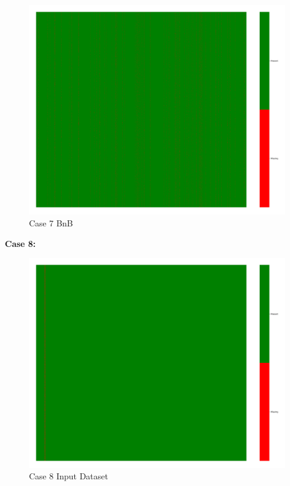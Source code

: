 \documentclass[a4paper,12pt]{article}
\begin{document}
\begin{figure}[H]
    \includegraphics[width=\linewidth]{case8_bnb_heatmap_cleaned.png}
    \caption*{Case 7 BnB}
\end{figure}

\textbf{Case 8:}
\begin{figure}[H]
    \centering
    \includegraphics[width=\linewidth]{case9_heatmap_erased.png}
    \caption*{Case 8 Input Dataset}
\end{figure}
\end{document}
